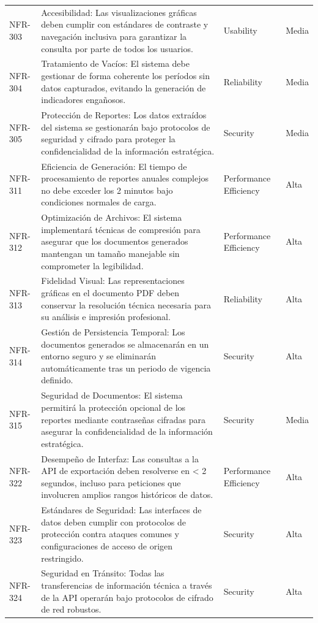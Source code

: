 \begin{longtable}{>{\raggedright\arraybackslash}p{} >{\raggedright\arraybackslash}p{} >{\raggedright\arraybackslash}p{} >{\raggedright\arraybackslash}p{}}
NFR-303 & Accesibilidad: Las visualizaciones gráficas deben cumplir con estándares de contraste y navegación inclusiva para garantizar la consulta por parte de todos los usuarios. & Usability & Media \\
NFR-304 & Tratamiento de Vacíos: El sistema debe gestionar de forma coherente los períodos sin datos capturados, evitando la generación de indicadores engañosos. & Reliability & Media \\
NFR-305 & Protección de Reportes: Los datos extraídos del sistema se gestionarán bajo protocolos de seguridad y cifrado para proteger la confidencialidad de la información estratégica. & Security & Media \\
NFR-311 & Eficiencia de Generación: El tiempo de procesamiento de reportes anuales complejos no debe exceder los 2 minutos bajo condiciones normales de carga. & Performance Efficiency & Alta \\
NFR-312 & Optimización de Archivos: El sistema implementará técnicas de compresión para asegurar que los documentos generados mantengan un tamaño manejable sin comprometer la legibilidad. & Performance Efficiency & Alta \\
NFR-313 & Fidelidad Visual: Las representaciones gráficas en el documento PDF deben conservar la resolución técnica necesaria para su análisis e impresión profesional. & Reliability & Alta \\
NFR-314 & Gestión de Persistencia Temporal: Los documentos generados se almacenarán en un entorno seguro y se eliminarán automáticamente tras un periodo de vigencia definido. & Security & Alta \\
NFR-315 & Seguridad de Documentos: El sistema permitirá la protección opcional de los reportes mediante contraseñas cifradas para asegurar la confidencialidad de la información estratégica. & Security & Media \\
NFR-322 & Desempeño de Interfaz: Las consultas a la API de exportación deben resolverse en < 2 segundos, incluso para peticiones que involucren amplios rangos históricos de datos. & Performance Efficiency & Alta \\
NFR-323 & Estándares de Seguridad: Las interfaces de datos deben cumplir con protocolos de protección contra ataques comunes y configuraciones de acceso de origen restringido. & Security & Alta \\
NFR-324 & Seguridad en Tránsito: Todas las transferencias de información técnica a través de la API operarán bajo protocolos de cifrado de red robustos. & Security & Alta \\

\end{longtable}
